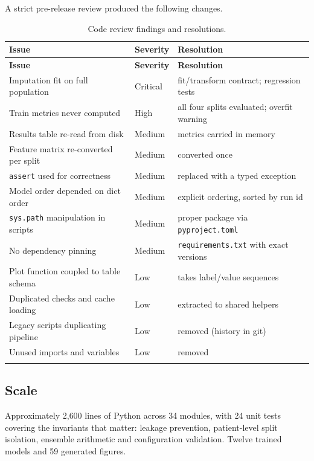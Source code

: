 \documentclass[11pt,a4paper]{article}
\newcommand{\code}[1]{\texttt{\small #1}}
\begin{document}
A strict pre-release review produced the following changes.

\begin{longtable}{@{}p{7.4cm} p{2.0cm} p{5.2cm}@{}}
\toprule
\textbf{Issue} & \textbf{Severity} & \textbf{Resolution} \\
\midrule
\endfirsthead
\toprule
\textbf{Issue} & \textbf{Severity} & \textbf{Resolution} \\
\midrule
\endhead
Imputation fit on full population       & Critical & fit/transform contract; regression tests \\
Train metrics never computed            & High     & all four splits evaluated; overfit warning \\
Results table re-read from disk         & Medium   & metrics carried in memory \\
Feature matrix re-converted per split   & Medium   & converted once \\
\code{assert} used for correctness      & Medium   & replaced with a typed exception \\
Model order depended on dict order      & Medium   & explicit ordering, sorted by run id \\
\code{sys.path} manipulation in scripts & Medium   & proper package via \code{pyproject.toml} \\
No dependency pinning                   & Medium   & \code{requirements.txt} with exact versions \\
Plot function coupled to table schema   & Low      & takes label/value sequences \\
Duplicated checks and cache loading     & Low      & extracted to shared helpers \\
Legacy scripts duplicating pipeline     & Low      & removed (history in git) \\
Unused imports and variables            & Low      & removed \\
\bottomrule
\caption{Code review findings and resolutions.}
\label{tab:review}
\end{longtable}

\subsection{Scale}

Approximately 2{,}600 lines of Python across 34 modules, with 24 unit tests
covering the invariants that matter: leakage prevention, patient-level split
isolation, ensemble arithmetic and configuration validation. Twelve trained
models and 59 generated figures.
\end{document}
